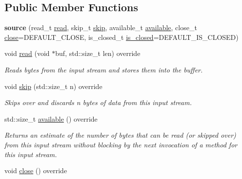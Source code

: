 \subsection*{Public Member Functions}
\begin{DoxyCompactItemize}
\item 
\mbox{\label{structdevfix_1_1base_1_1io_1_1source_af8bef20f5b54153c3fd1fbc7daa263c5}} 
{\bfseries source} (read\+\_\+t \hyperlink{structdevfix_1_1base_1_1io_1_1source_a9fbd4d20aa150910ced44018e1b3156a}{read}, skip\+\_\+t \hyperlink{structdevfix_1_1base_1_1io_1_1source_a21cb579307589cbc6f9e02d64c66f4b2}{skip}, available\+\_\+t \hyperlink{structdevfix_1_1base_1_1io_1_1source_a911f4ba79499a623de30cf16d3d26d47}{available}, close\+\_\+t \hyperlink{structdevfix_1_1base_1_1io_1_1source_aa00a381c8a166cbbc5dbf6de4b56590e}{close}=D\+E\+F\+A\+U\+L\+T\+\_\+\+C\+L\+O\+SE, is\+\_\+closed\+\_\+t \hyperlink{structdevfix_1_1base_1_1io_1_1source_a406834cf6651d48949b96d0ef49cc6c1}{is\+\_\+closed}=D\+E\+F\+A\+U\+L\+T\+\_\+\+I\+S\+\_\+\+C\+L\+O\+S\+ED)
\item 
void \hyperlink{structdevfix_1_1base_1_1io_1_1source_a9fbd4d20aa150910ced44018e1b3156a}{read} (void $\ast$buf, std\+::size\+\_\+t len) override
\begin{DoxyCompactList}\small\item\em Reads bytes from the input stream and stores them into the buffer. \end{DoxyCompactList}\item 
void \hyperlink{structdevfix_1_1base_1_1io_1_1source_a21cb579307589cbc6f9e02d64c66f4b2}{skip} (std\+::size\+\_\+t n) override
\begin{DoxyCompactList}\small\item\em Skips over and discards n bytes of data from this input stream. \end{DoxyCompactList}\item 
std\+::size\+\_\+t \hyperlink{structdevfix_1_1base_1_1io_1_1source_a911f4ba79499a623de30cf16d3d26d47}{available} () override
\begin{DoxyCompactList}\small\item\em Returns an estimate of the number of bytes that can be read (or skipped over) from this input stream without blocking by the next invocation of a method for this input stream. \end{DoxyCompactList}\item 
void \hyperlink{structdevfix_1_1base_1_1io_1_1source_aa00a381c8a166cbbc5dbf6de4b56590e}{close} () override

\end{DoxyCompactItemize}
